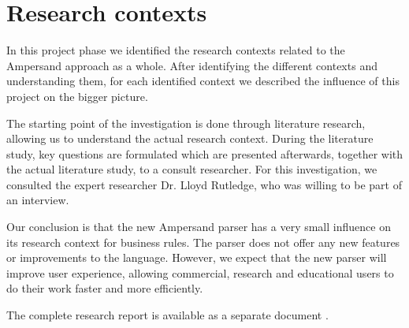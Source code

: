 
\section{Research contexts}
\label{sec:research-context}
In this project phase we identified the research contexts related to the Ampersand approach as a whole.
After identifying the different contexts and understanding them, for each identified context we described the influence of this project on the bigger picture.

The starting point of the investigation is done through literature research, allowing us to understand the actual research context.
During the literature study, key questions are formulated which are presented afterwards, together with the actual literature study, to a consult researcher.
For this investigation, we consulted the expert researcher Dr. Lloyd Rutledge, who was willing to be part of an interview.

Our conclusion is that the new Ampersand parser has a very small influence on its research context for business rules.
The parser does not offer any new features or improvements to the language.
However, we expect that the new parser will improve user experience, allowing commercial, research and educational users to do their work faster and more efficiently.

The complete research report is available as a separate document .
